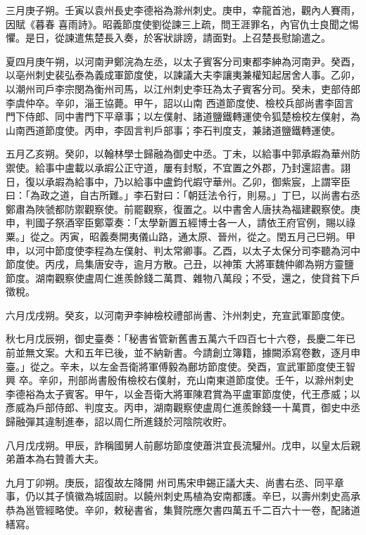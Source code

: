 \begin{pinyinscope}
 三月庚子朔。壬寅以袁州長史李德裕為滁州刺史。庚申，幸龍首池，觀內人賽雨，因賦《暮春
 喜雨詩》。昭義節度使劉從諫三上疏，問王涯罪名，內官仇士良聞之惕懼。是日，從諫遣焦楚長入奏，於客狀誹謗，請面對。上召楚長慰諭遣之。



 夏四月庚午朔，以河南尹鄭浣為左丞，以太子賓客分司東都李紳為河南尹。癸酉，以亳州刺史裴弘泰為義成軍節度使，以諫議大夫李讓夷兼權知起居舍人事。乙卯，以潮州司戶李宗閔為衡州司馬，以江州刺史李玨為太子賓客分司。癸未，吏部侍郎李虞仲卒。辛卯，淄王協薨。甲午，詔以山南
 西道節度使、檢校兵部尚書李固言門下侍郎、同中書門下平章事；以左僕射、諸道鹽鐵轉運使令狐楚檢校左僕射，為山南西道節度使。丙申，李固言判戶部事；李石判度支，兼諸道鹽鐵轉運使。



 五月乙亥朔。癸卯，以翰林學士歸融為御史中丞。丁未，以給事中郭承嘏為華州防禦使。給事中盧載以承嘏公正守道，屢有封駁，不宜置之外郡，乃封還詔書。詡日，復以承嘏為給事中，乃以給事中盧鈞代嘏守華州。乙卯，御紫宸，上謂宰臣
 曰：「為政之道，自古所難。」李石對曰：「朝廷法令行，則易。」丁巳，以尚書右丞鄭肅為陜虢都防禦觀察使。前罷觀察，復置之。以中書舍人唐扶為福建觀察使。庚申，判國子祭酒宰臣鄭覃奏：「太學新置五經博士各一人，請依王府官例，賜以祿粟。」從之。丙寅，昭義奏開夷儀山路，通太原、晉州，從之。閏五月己巳朔。甲申，以河中節度使李程為左僕射、判太常卿事。乙酉，以太子太保分司李聽為河中節度使。丙戌，烏集唐安寺，逾月方散。己丑，以神策
 大將軍魏仲卿為朔方靈鹽節度。湖南觀察使盧周仁進羨餘錢二萬貫、雜物八萬段；不受，還之，使貸貧下戶徵稅。



 六月戊戌朔。癸亥，以河南尹李紳檢校禮部尚書、汴州刺史，充宣武軍節度使。



 秋七月戊辰朔，御史臺奏：「秘書省管新舊書五萬六千四百七十六卷，長慶二年已前並無文案。大和五年已後，並不納新書。今請創立簿籍，據闕添寫卷數，逐月申臺。」從之。辛未，以左金吾衛將軍傅毅為鄜坊節度使。癸酉，宣武軍節度使王智興
 卒。辛卯，刑部尚書殷侑檢校右僕射，充山南東道節度使。壬午，以滁州刺史李德裕為太子賓客。甲午，以金吾衛大將軍陳君賞為平盧軍節度使，代王彥威；以彥威為戶部侍郎、判度支。丙申，湖南觀察使盧周仁進羨餘錢一十萬貫，御史中丞歸融彈其違制進奉，詔以周仁所進錢於河陰院收貯。



 八月戊戌朔。甲辰，詐稱國舅人前鄜坊節度使蕭洪宜長流驩州。戊申，以皇太后親弟蕭本為右贊善大夫。



 九月丁卯朔。庚辰，詔復故左降開
 州司馬宋申錫正議大夫、尚書右丞、同平章事，仍以其子慎徽為城固尉。以饒州刺史馬植為安南都護。辛巳，以壽州刺史高承恭為邕管經略使。辛卯，敕秘書省，集賢院應欠書四萬五千二百六十一卷，配諸道繕寫。




\end{pinyinscope}
